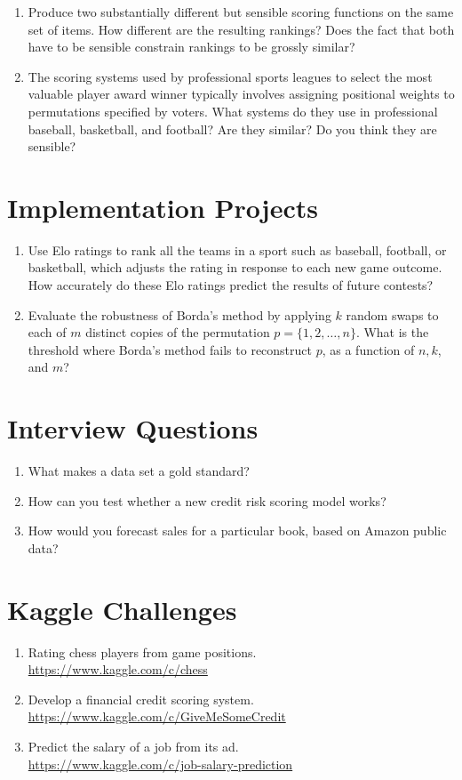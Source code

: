 \documentclass[10pt]{article}
\begin{document}
\begin{enumerate}
    \item Produce two substantially different but sensible scoring functions on the same set of items. How different are the resulting rankings? Does the fact that both have to be sensible constrain rankings to be grossly similar?
    
    \item The scoring systems used by professional sports leagues to select the most valuable player award winner typically involves assigning positional weights to permutations specified by voters. What systems do they use in professional baseball, basketball, and football? Are they similar? Do you think they are sensible?
\end{enumerate}

\section*{Implementation Projects}
\begin{enumerate}
    \item Use Elo ratings to rank all the teams in a sport such as baseball, football, or basketball, which adjusts the rating in response to each new game outcome. How accurately do these Elo ratings predict the results of future contests?
    
    \item Evaluate the robustness of Borda's method by applying $k$ random swaps to each of $m$ distinct copies of the permutation $p=\{1,2, \ldots, n\}$. What is the threshold where Borda's method fails to reconstruct $p$, as a function of $n, k$, and $m$?
\end{enumerate}

\section*{Interview Questions}
\begin{enumerate}
    \item What makes a data set a gold standard?
    \item How can you test whether a new credit risk scoring model works?
    \item How would you forecast sales for a particular book, based on Amazon public data?
\end{enumerate}

\section*{Kaggle Challenges}
\begin{enumerate}
    \item Rating chess players from game positions.\\ \url{https://www.kaggle.com/c/chess}
    \item Develop a financial credit scoring system.\\ \url{https://www.kaggle.com/c/GiveMeSomeCredit}
    \item Predict the salary of a job from its ad.\\ \url{https://www.kaggle.com/c/job-salary-prediction}
\end{enumerate}
\end{document}
